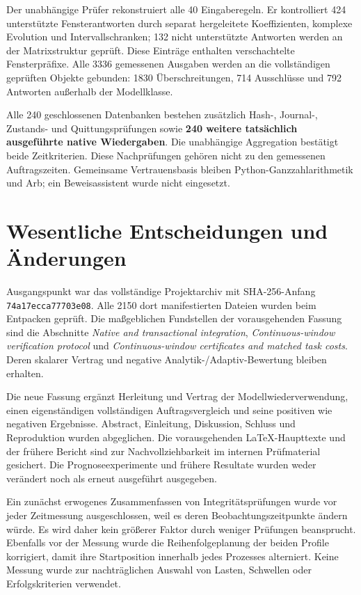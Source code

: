 \documentclass[11pt,a4paper]{article}
\begin{document}
Der unabhängige Prüfer rekonstruiert alle 40 Eingaberegeln. Er kontrolliert 424 unterstützte Fensterantworten durch separat hergeleitete Koeffizienten, komplexe Evolution und Intervallschranken; 132 nicht unterstützte Antworten werden an der Matrixstruktur geprüft. Diese Einträge enthalten verschachtelte Fensterpräfixe. Alle 3336 gemessenen Ausgaben werden an die vollständigen geprüften Objekte gebunden: 1830 Überschreitungen, 714 Ausschlüsse und 792 Antworten außerhalb der Modellklasse.

Alle 240 geschlossenen Datenbanken bestehen zusätzlich Hash-, Journal-, Zustands- und Quittungsprüfungen sowie \textbf{240 weitere tatsächlich ausgeführte native Wiedergaben}. Die unabhängige Aggregation bestätigt beide Zeitkriterien. Diese Nachprüfungen gehören nicht zu den gemessenen Auftragszeiten. Gemeinsame Vertrauensbasis bleiben Python-Ganzzahlarithmetik und Arb; ein Beweisassistent wurde nicht eingesetzt.

\section*{Wesentliche Entscheidungen und Änderungen}
Ausgangspunkt war das vollständige Projektarchiv mit SHA-256-Anfang \texttt{74a17ecca77703e08}. Alle 2150 dort manifestierten Dateien wurden beim Entpacken geprüft. Die maßgeblichen Fundstellen der vorausgehenden Fassung sind die Abschnitte \emph{Native and transactional integration}, \emph{Continuous-window verification protocol} und \emph{Continuous-window certificates and matched task costs}. Deren skalarer Vertrag und negative Analytik-/Adaptiv-Bewertung bleiben erhalten.

Die neue Fassung ergänzt Herleitung und Vertrag der Modellwiederverwendung, einen eigenständigen vollständigen Auftragsvergleich und seine positiven wie negativen Ergebnisse. Abstract, Einleitung, Diskussion, Schluss und Reproduktion wurden abgeglichen. Die vorausgehenden LaTeX-Haupttexte und der frühere Bericht sind zur Nachvollziehbarkeit im internen Prüfmaterial gesichert. Die Prognoseexperimente und frühere Resultate wurden weder verändert noch als erneut ausgeführt ausgegeben.

\newpage
Ein zunächst erwogenes Zusammenfassen von Integritätsprüfungen wurde vor jeder Zeitmessung ausgeschlossen, weil es deren Beobachtungszeitpunkte ändern würde. Es wird daher kein größerer Faktor durch weniger Prüfungen beansprucht. Ebenfalls vor der Messung wurde die Reihenfolgeplanung der beiden Profile korrigiert, damit ihre Startposition innerhalb jedes Prozesses alterniert. Keine Messung wurde zur nachträglichen Auswahl von Lasten, Schwellen oder Erfolgskriterien verwendet.
\end{document}

